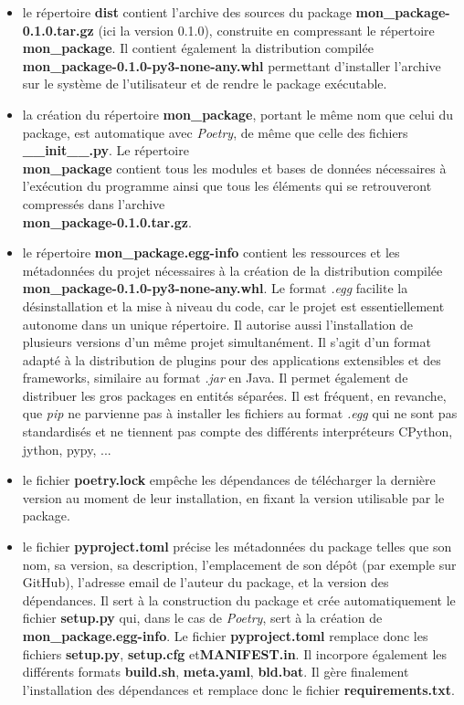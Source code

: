 \documentclass[twoside,a4paper,11pt,frenchb,openany]{report}
\begin{document}
\begin{itemize}
\item le répertoire \textbf{dist} contient l'archive des sources du package \textbf{mon\_package-0.1.0.tar.gz} (ici la version 0.1.0), construite en compressant le répertoire \textbf{mon\_package}. Il contient également la distribution compilée \textbf{mon\_package-0.1.0-py3-none-any.whl} permettant d'installer l'archive sur le système de l'utilisateur et de rendre le package exécutable. 
\item la création du répertoire \textbf{mon\_package}, portant le même nom que celui du package, est automatique avec \textit{Poetry}, de même que celle des fichiers \textbf{\_\_init\_\_.py}. Le répertoire \\\textbf{mon\_package} contient tous les modules et bases de données nécessaires à l'exécution du programme ainsi que tous les éléments qui se retrouveront compressés dans l'archive \\\textbf{mon\_package-0.1.0.tar.gz}.
\item le répertoire \textbf{mon\_package.egg-info} contient les ressources et les métadonnées du projet nécessaires à la création de la distribution compilée \textbf{mon\_package-0.1.0-py3-none-any.whl}. Le format \textit{.egg} facilite la désinstallation et la mise à niveau du code, car le projet est essentiellement autonome dans un unique répertoire. Il autorise aussi l'installation de plusieurs versions d'un même projet simultanément. Il s'agit d'un format adapté à la distribution de plugins pour des applications extensibles et des frameworks, similaire au format \textit{.jar} en Java. Il permet également de distribuer les gros packages en entités séparées. Il est fréquent, en revanche, que \textit{pip} ne parvienne pas à installer les fichiers au format \textit{.egg} qui ne sont pas standardisés et ne tiennent pas compte des différents interpréteurs CPython, jython, pypy, ... 
\item le fichier \textbf{poetry.lock} empêche les dépendances de télécharger la dernière version au moment de leur installation, en fixant la version utilisable par le package.
\item le fichier \textbf{pyproject.toml} précise les métadonnées du package telles que son nom, sa version, sa description, l’emplacement de son dépôt (par exemple sur GitHub), l’adresse email de l’auteur du package, et la version des dépendances. Il sert à la construction du package et crée automatiquement le fichier \textbf{setup.py} qui, dans le cas de \textit{Poetry}, sert à la création de \textbf{mon\_package.egg-info}. Le fichier \textbf{pyproject.toml} remplace donc les fichiers \textbf{setup.py}, \textbf{setup.cfg} et\textbf{MANIFEST.in}. Il incorpore également les différents formats \textbf{build.sh}, \textbf{meta.yaml}, \textbf{bld.bat}. Il gère finalement l'installation des dépendances et remplace donc le fichier \textbf{requirements.txt}. 

\end{itemize}
\end{document}
